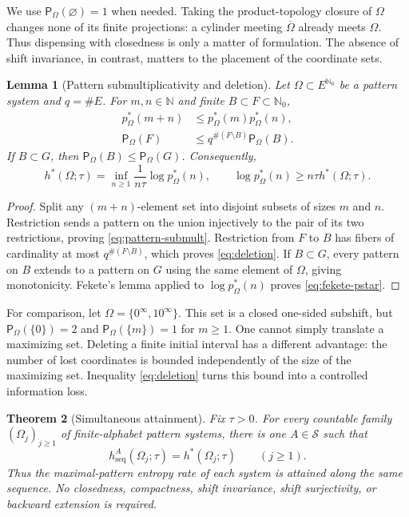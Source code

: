 \documentclass[11pt,reqno]{amsart}
\numberwithin{equation}{section}
\newtheorem{theorem}{Theorem}[section]
\newtheorem{lemma}[theorem]{Lemma}
\theoremstyle{definition}
\newcommand{\N}{\mathbb N}
\newcommand{\Nzero}{\mathbb N_0}
\newcommand{\Patt}{\mathsf P}
\newcommand{\hseq}{h_{\mathrm{seq}}}
\newcommand{\hpat}{h^{*}}
\begin{document}
We use $\Patt_\Omega(\varnothing)=1$ when needed.
Taking the product-topology closure of $\Omega$ changes none of its
finite projections: a cylinder meeting $\overline\Omega$ already meets
$\Omega$. Thus dispensing with closedness is only a matter of
formulation. The absence of shift invariance, in contrast, matters to the
placement of the coordinate sets.

\begin{lemma}[Pattern submultiplicativity and deletion]\label{lem:pattern-submult}
Let $\Omega\subset E^{\Nzero}$ be a pattern system and $q=\#E$.
For $m,n\in\N$ and finite $B\subset F\subset\Nzero$,
\begin{align}
 p_\Omega^*(m+n)&\le p_\Omega^*(m)p_\Omega^*(n),
 \label{eq:pattern-submult}\\
 \Patt_\Omega(F)&\le q^{\#(F\setminus B)}\Patt_\Omega(B).
 \label{eq:deletion} 
\end{align}
If $B\subset G$, then $\Patt_\Omega(B)\le\Patt_\Omega(G)$.
Consequently,
\begin{equation}\label{eq:fekete-pstar}
 \hpat(\Omega;\tau)
 =\inf_{n\ge1}\frac1{n\tau}\log p_\Omega^*(n),
 \qquad
 \log p_\Omega^*(n)\ge n\tau\hpat(\Omega;\tau).
\end{equation}
\end{lemma}

\begin{proof}
Split any $(m+n)$-element set into disjoint subsets of sizes $m$ and $n$.
Restriction sends a pattern on the union injectively to the pair of its two
restrictions, proving \eqref{eq:pattern-submult}.  Restriction from $F$ to
$B$ has fibers of cardinality at most $q^{\#(F\setminus B)}$, which proves
\eqref{eq:deletion}.  If $B\subset G$, every pattern on $B$ extends to a
pattern on $G$ using the same element of $\Omega$, giving monotonicity.
Fekete's lemma applied to $\log p_\Omega^*(n)$ proves
\eqref{eq:fekete-pstar}.
\end{proof}

For comparison, let $\Omega=\{0^\infty,10^\infty\}$. This set is a
closed one-sided subshift, but
$\Patt_\Omega(\{0\})=2$ and $\Patt_\Omega(\{m\})=1$ for $m\ge1$.
One cannot simply translate a maximizing set. Deleting a finite initial
interval has a different advantage: the number of lost coordinates is
bounded independently of the size of the maximizing set. Inequality
\eqref{eq:deletion} turns this bound into a controlled information loss.

\begin{theorem}[Simultaneous attainment]\label{thm:A}
Fix $\tau>0$.  For every countable family
$(\Omega_j)_{j\ge1}$ of finite-alphabet pattern systems, there is one
$A\in\mathscr S$ such that
\begin{equation}\label{eq:simultaneous-attainment}
 \hseq^A(\Omega_j;\tau)=\hpat(\Omega_j;\tau)
 \qquad(j\ge1).
\end{equation}
Thus the maximal-pattern entropy rate of each system is attained along the same
sequence.  No closedness, compactness, shift invariance, shift surjectivity, or
backward extension is required.
\end{theorem}
\end{document}
